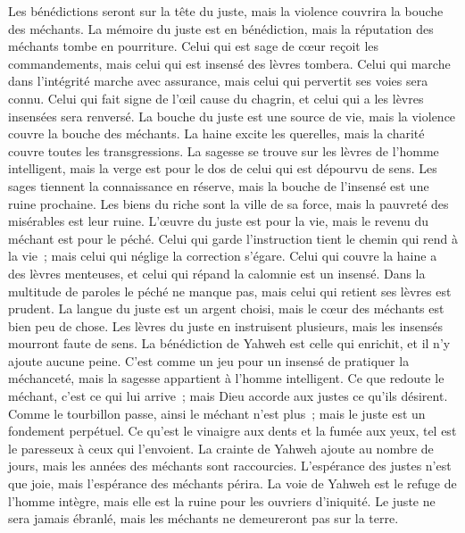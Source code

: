 \begin{multicols}{2}
Les bénédictions seront sur la tête du juste, mais la violence couvrira la bouche des méchants.
La mémoire du juste est en bénédiction, mais la réputation des méchants tombe en pourriture.
Celui qui est sage de cœur reçoit les commandements, mais celui qui est insensé des lèvres tombera.
Celui qui marche dans l'intégrité marche avec assurance, mais celui qui pervertit ses voies sera connu.
Celui qui fait signe de l'œil cause du chagrin, et celui qui a les lèvres insensées sera renversé.
La bouche du juste est une source de vie, mais la violence couvre la bouche des méchants.
La haine excite les querelles, mais la charité couvre toutes les transgressions.
La sagesse se trouve sur les lèvres de l'homme intelligent, mais la verge est pour le dos de celui qui est dépourvu de sens.
Les sages tiennent la connaissance en réserve, mais la bouche de l'insensé est une ruine prochaine.
Les biens du riche sont la ville de sa force, mais la pauvreté des misérables est leur ruine.
L'œuvre du juste est pour la vie, mais le revenu du méchant est pour le péché.
Celui qui garde l'instruction tient le chemin qui rend à la vie~; mais celui qui néglige la correction s'égare.
Celui qui couvre la haine a des lèvres menteuses, et celui qui répand la calomnie est un insensé.
Dans la multitude de paroles le péché ne manque pas, mais celui qui retient ses lèvres est prudent.
La langue du juste est un argent choisi, mais le cœur des méchants est bien peu de chose.
Les lèvres du juste en instruisent plusieurs, mais les insensés mourront faute de sens.
La bénédiction de Yahweh est celle qui enrichit, et il n'y ajoute aucune peine.
C'est comme un jeu pour un insensé de pratiquer la méchanceté, mais la sagesse appartient à l'homme intelligent.
Ce que redoute le méchant, c'est ce qui lui arrive~; mais Dieu accorde aux justes ce qu'ils désirent.
Comme le tourbillon passe, ainsi le méchant n'est plus~; mais le juste est un fondement perpétuel.
Ce qu'est le vinaigre aux dents et la fumée aux yeux, tel est le paresseux à ceux qui l'envoient.
La crainte de Yahweh ajoute au nombre de jours, mais les années des méchants sont raccourcies.
L'espérance des justes n'est que joie, mais l'espérance des méchants périra.
La voie de Yahweh est le refuge de l'homme intègre, mais elle est la ruine pour les ouvriers d'iniquité.
Le juste ne sera jamais ébranlé, mais les méchants ne demeureront pas sur la terre.

\end{multicols}

